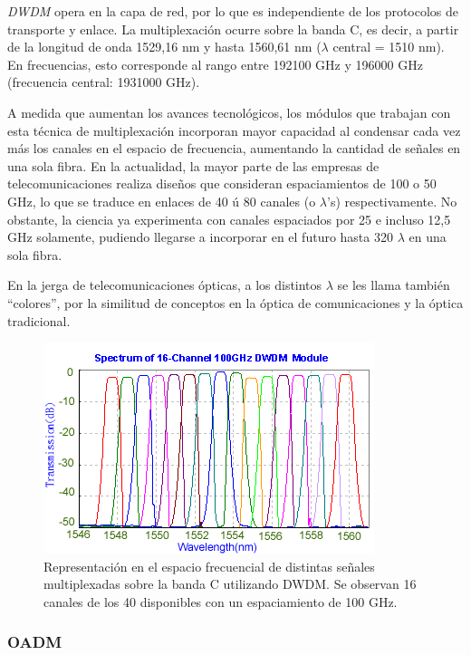 \emph{DWDM} opera en la capa de red, por lo que es independiente de
los protocolos de transporte y enlace. La multiplexación ocurre sobre
la banda C, es decir, a partir de la longitud de onda 1529,16 nm y
hasta 1560,61 nm ($\lambda$ central = 1510 nm). En frecuencias, esto
corresponde al rango entre 192100 GHz y 196000 GHz (frecuencia
central: 1931000 GHz).

A medida que aumentan los avances tecnológicos, los módulos que
trabajan con esta técnica de multiplexación incorporan mayor capacidad
al condensar cada vez más los canales en el espacio de frecuencia,
aumentando la cantidad de señales en una sola fibra. En la actualidad,
la mayor parte de las empresas de telecomunicaciones realiza diseños
que consideran espaciamientos de 100 o 50 GHz, lo que se traduce en
enlaces de 40 ú 80 canales (o $\lambda$'s) respectivamente. No
obstante, la ciencia ya experimenta con canales espaciados por 25 e
incluso 12,5 GHz solamente, pudiendo llegarse a incorporar en el
futuro hasta 320 $\lambda$ en una sola fibra. 

En la jerga de telecomunicaciones ópticas, a los distintos $\lambda$
se les llama también ``colores'', por la similitud de conceptos en la
óptica de comunicaciones y la óptica tradicional.

\begin{figure}[H]
  \centering
  \includegraphics[scale=1]{Imagenes/DWDM_channels.png}
  \caption{Representación en el espacio frecuencial de distintas
    señales multiplexadas sobre la banda C utilizando DWDM.\cite{bandasdwdm} Se
    observan 16 canales de los 40 disponibles con un espaciamiento de
    100 GHz.}
  \label{fig:dwdmchannels}
\end{figure}

\subsubsection{OADM}
\label{sec:oadm}

